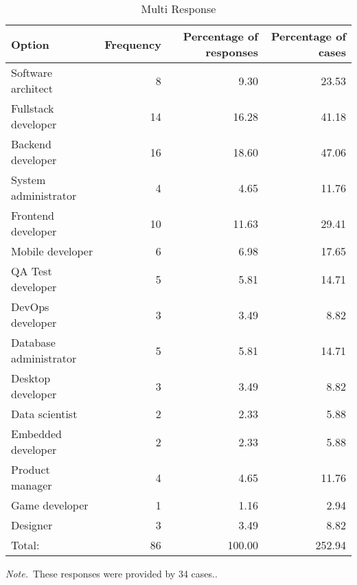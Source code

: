 \documentclass[a4paper,man,hidelinks,floatsintext,x11names]{apa7}
\begin{document}
           
      
        
      
    
\begin{table}[!htbp]
\caption{Multi Response}
\label{tab:Table_2}
\begin{adjustbox}{max size={\columnwidth}{\textheight}}
\centering
\begin{tabular}{lrrr}
\toprule
Option                 & Frequency & Percentage of responses & Percentage of cases \\
\midrule
Software architect     &         8 &                    9.30 &               23.53 \\
Fullstack developer    &        14 &                   16.28 &               41.18 \\
Backend developer      &        16 &                   18.60 &               47.06 \\
System administrator   &         4 &                    4.65 &               11.76 \\
Frontend developer     &        10 &                   11.63 &               29.41 \\
Mobile developer       &         6 &                    6.98 &               17.65 \\
QA Test developer      &         5 &                    5.81 &               14.71 \\
DevOps developer       &         3 &                    3.49 &                8.82 \\
Database administrator &         5 &                    5.81 &               14.71 \\
Desktop developer      &         3 &                    3.49 &                8.82 \\
Data scientist         &         2 &                    2.33 &                5.88 \\
Embedded developer     &         2 &                    2.33 &                5.88 \\
Product manager        &         4 &                    4.65 &               11.76 \\
Game developer         &         1 &                    1.16 &                2.94 \\
Designer               &         3 &                    3.49 &                8.82 \\
Total:                 &        86 &                  100.00 &              252.94 \\
\bottomrule
\end{tabular}
\end{adjustbox}
\begin{tablenotes} {
\small
\textit{Note.}~These responses were provided by 34 cases.. \\
}
\end{tablenotes}
\end{table}
\end{document}
